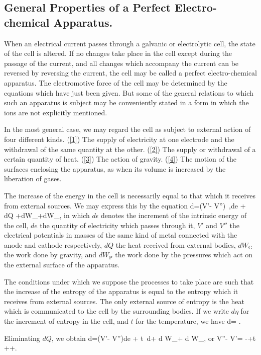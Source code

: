 \documentclass[12pt]{article}
\begin{document}
\subsection{General Properties of a Perfect Electro-chemical Apparatus.}
When an electrical current passes through a galvanic or electrolytic cell, the state of the cell is altered. If no changes take place in the cell except during the passage of the current, and all changes which accompany the current can be reversed by reversing the current, the cell may be called a perfect electro-chemical apparatus. The electromotive force of the cell may be determined by the equations which have just been given. But some of the general relations to which such an apparatus is subject may be conveniently stated in a form in which the ions are not explicitly mentioned.

In the most general case, we may regard the cell as subject to external action of four different kinds. (\ref{1}) The supply of electricity at one electrode and the withdrawal of the same quantity at the other. (\ref{2}) The supply or withdrawal of a certain quantity of heat. (\ref{3}) The action of gravity. (\ref{4}) The motion of the surfaces enclosing the apparatus, as when its volume is increased by the liberation of gases.

The increase of the energy in the cell is necessarily equal to that which it receives from external sources. We may express this by the equation
\eqs d\epsilon=(V'- V'')\ ,de + dQ +dW_+dW_, \label{691} \eqe
in which $d\epsilon$ denotes the increment of the intrinsic energy of the cell, $de$ the quantity of electricity which passes through it, $V'$ and $V''$ the electrical potentials in masses of the same kind of metal connected with the anode and cathode respectively, $dQ$ the heat received from external bodies, $dW_\text{G}$ the work done by gravity, and $dW_\text{P}$ the work done by the pressures which act on the external surface of the apparatus.

The conditions under which we suppose the processes to take place are such that the increase of the entropy of the apparatus is equal to the entropy which it receives from external sources. The only external source of entropy is the heat which is communicated to the cell by the surrounding bodies. If we write $d\eta$ for the increment of entropy in the cell, and $t$ for the temperature, we have
\eqs d\eta = .\label{692} \eqe

Eliminating $dQ$, we obtain
\eqs d\epsilon=(V'- V'')de + t\, d\eta + d W_+ d W_, \label{693} \eqe
or
\eqs V''- V'= -+t ++. \label{694} \eqe
\end{document}
